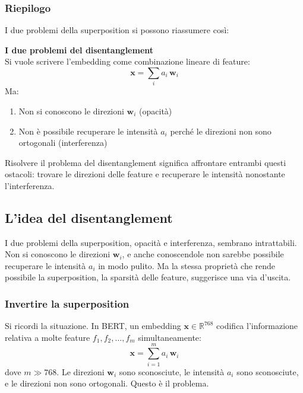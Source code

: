 \subsubsection{Riepilogo}
I due problemi della superposition si possono riassumere così:
\begin{notebox}
\textbf{I due problemi del disentanglement}\\[0.5em]
Si vuole scrivere l'embedding come combinazione lineare di feature:
\begin{equation*}
    \mathbf{x} = \sum_i a_i \, \mathbf{w}_i
\end{equation*}
Ma:
\begin{enumerate}
    \item Non si conoscono le direzioni $\mathbf{w}_i$ (opacità)
    \item Non è possibile recuperare le intensità $a_i$ perché le direzioni non sono ortogonali (interferenza)
\end{enumerate}
\end{notebox}
Risolvere il problema del disentanglement significa affrontare entrambi questi ostacoli: trovare le direzioni delle feature e recuperare le intensità nonostante l'interferenza.

\subsection{L'idea del disentanglement}
\label{subsec:idea_disentanglement}
I due problemi della superposition, opacità e interferenza, sembrano intrattabili. Non si conoscono le direzioni $\mathbf{w}_i$, e anche conoscendole non sarebbe possibile recuperare le intensità $a_i$ in modo pulito.
Ma la stessa proprietà che rende possibile la superposition, la sparsità delle feature, suggerisce una via d'uscita.
\subsubsection{Invertire la superposition}

Si ricordi la situazione. In BERT, un embedding $\mathbf{x} \in \mathbb{R}^{768}$ codifica l'informazione relativa a molte feature $f_1, f_2, \dots, f_m$ simultaneamente:
\begin{equation}
    \mathbf{x} = \sum_{i=1}^{m} a_i \, \mathbf{w}_i
\end{equation}
dove $m \gg 768$. Le direzioni $\mathbf{w}_i$ sono sconosciute, le intensità $a_i$ sono sconosciute, e le direzioni non sono ortogonali. Questo è il problema.

